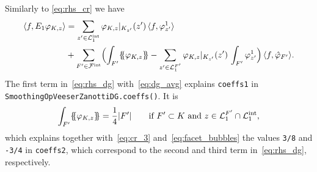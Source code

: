 \documentclass[oneeqnum]{siamart220329}
\newcommand*{\ldblbrace}{\{\mskip-5mu\{}
\newcommand*{\rdblbrace}{\}\mskip-5mu\}}
\begin{document}
Similarly to \cref{eq:rhs_cr} we have
%
\begin{equation}
  \label{eq:rhs_dg}
  \begin{aligned}
    \langle f, E_1 \varphi_{K,z} \rangle
    &= \sum_{z'\in\mathcal{L}^{\mathrm{int}}_1} \varphi_{K,z}|_{K_{z'}}(z')
      \, \langle f, \varphi^1_{z'} \rangle
    \\
    &+ \sum_{F'\in \mathcal{F}^{\mathrm{int}}} \Bigl( \int_{F'} \ldblbrace
      \varphi_{K,z} \rdblbrace - \sum_{z'\in\mathcal{L}^{F'}_1}
      \varphi_{K,z}|_{K_{z'}}(z') \, \int_{F'} \varphi_{z'}^1 \Bigr)
      \, \langle f, \hat\varphi_{F'} \rangle.
  \end{aligned}
\end{equation}
%
The first term in~\cref{eq:rhs_dg} with~\cref{eq:dg_avg} explains
\texttt{coeffs1} in \texttt{SmoothingOpVeeserZanottiDG\allowbreak.coeffs()}.
It is
%
\begin{equation*}
  \int_{F'} \ldblbrace \varphi_{K,z} \rdblbrace = \frac14 |F'|
  \qquad \text{if $F'\subset K$ and
               $z\in\mathcal{L}^{F'}_1\cap\mathcal{L}^{\mathrm{int}}_1$,}
\end{equation*}
%
which explains together with~\cref{eq:cr_3} and~\cref{eq:facet_bubbles}
the values \texttt{3/8} and \texttt{-3/4} in \texttt{coeffs2}, which
correspond to the second and third term in~\cref{eq:rhs_dg}, respectively.


\begingroup
\raggedbottom
{}


\endgroup
\end{document}
